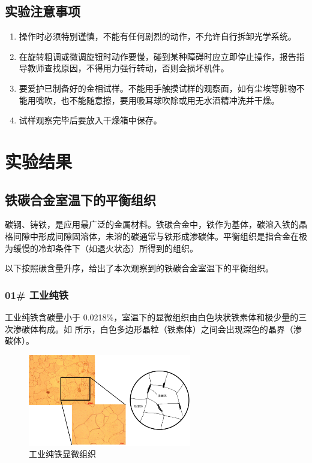 \documentclass[a4paper,utf8]{article}
\begin{document}
    \subsection{实验注意事项}
        \begin{enumerate}
            \item 操作时必须特别谨慎，不能有任何剧烈的动作，不允许自行拆卸光学系统。
            \item 在旋转粗调或微调旋钮时动作要慢，碰到某种障碍时应立即停止操作，报告指导教师查找原因，不得用力强行转动，否则会损坏机件。
            \item 要爱护已制备好的金相试样。不能用手触摸试样的观察面，如有尘埃等脏物不能用嘴吹，也不能随意擦，要用吸耳球吹除或用无水酒精冲洗并干燥。
            \item 试样观察完毕后要放入干燥箱中保存。
        \end{enumerate}
\section{实验结果}
    \subsection{铁碳合金室温下的平衡组织}
        碳钢、铸铁，是应用最广泛的金属材料。铁碳合金中，铁作为基体，碳溶入铁的晶格间隙中形成间隙固溶体，未溶的碳通常与铁形成渗碳体。平衡组织是指合金在极为缓慢的冷却条件下（如退火状态）所得到的组织。\par
        以下按照碳含量升序，给出了本次观察到的铁碳合金室温下的平衡组织。
        \subsubsection{01# 工业纯铁}
            工业纯铁含碳量小于 0.0218\%，室温下的显微组织由白色块状铁素体和极少量的三次渗碳体构成。如 所示，白色多边形晶粒（铁素体）之间会出现深色的晶界（渗碳体）。
            \begin{figure}[!ht]
                \includegraphics[height=40mm]{result/1.pdf}
                \caption{工业纯铁显微组织\label{fig:1}}
            \end{figure}
\end{document}
